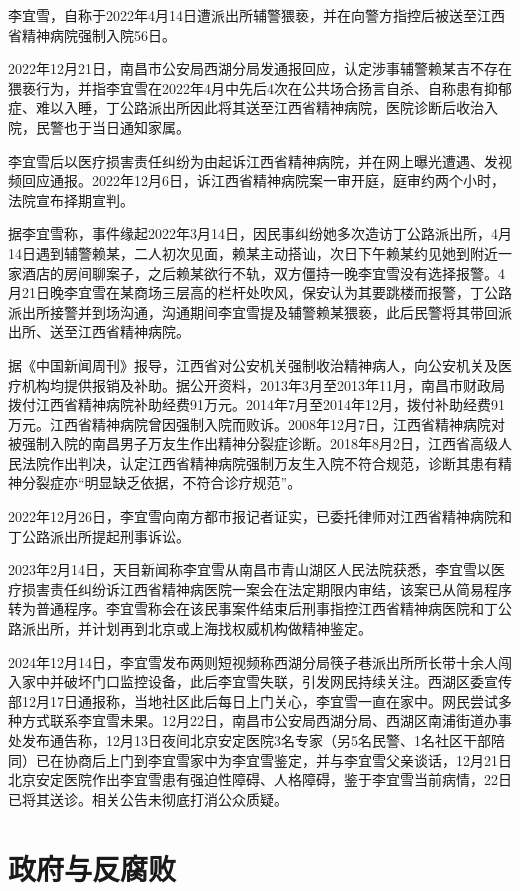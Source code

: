 李宜雪，自称于2022年4月14日遭派出所辅警猥亵，并在向警方指控后被送至江西省精神病院强制入院56日。

2022年12月21日，南昌市公安局西湖分局发通报回应，认定涉事辅警赖某吉不存在猥亵行为，并指李宜雪在2022年4月中先后4次在公共场合扬言自杀、自称患有抑郁症、难以入睡，丁公路派出所因此将其送至江西省精神病院，医院诊断后收治入院，民警也于当日通知家属。

李宜雪后以医疗损害责任纠纷为由起诉江西省精神病院，并在网上曝光遭遇、发视频回应通报。2022年12月6日，诉江西省精神病院案一审开庭，庭审约两个小时，法院宣布择期宣判。

据李宜雪称，事件缘起2022年3月14日，因民事纠纷她多次造访丁公路派出所，4月14日遇到辅警赖某，二人初次见面，赖某主动搭讪，次日下午赖某约见她到附近一家酒店的房间聊案子，之后赖某欲行不轨，双方僵持一晚李宜雪没有选择报警。4月21日晚李宜雪在某商场三层高的栏杆处吹风，保安认为其要跳楼而报警，丁公路派出所接警并到场沟通，沟通期间李宜雪提及辅警赖某猥亵，此后民警将其带回派出所、送至江西省精神病院。

据《中国新闻周刊》报导，江西省对公安机关强制收治精神病人，向公安机关及医疗机构均提供报销及补助。据公开资料，2013年3月至2013年11月，南昌市财政局拨付江西省精神病院补助经费91万元。2014年7月至2014年12月，拨付补助经费91万元。江西省精神病院曾因强制入院而败诉。2008年12月7日，江西省精神病院对被强制入院的南昌男子万友生作出精神分裂症诊断。2018年8月2日，江西省高级人民法院作出判决，认定江西省精神病院强制万友生入院不符合规范，诊断其患有精神分裂症亦“明显缺乏依据，不符合诊疗规范”。

2022年12月26日，李宜雪向南方都市报记者证实，已委托律师对江西省精神病院和丁公路派出所提起刑事诉讼。

2023年2月14日，天目新闻称李宜雪从南昌市青山湖区人民法院获悉，李宜雪以医疗损害责任纠纷诉江西省精神病医院一案会在法定期限内审结，该案已从简易程序转为普通程序。李宜雪称会在该民事案件结束后刑事指控江西省精神病医院和丁公路派出所，并计划再到北京或上海找权威机构做精神鉴定。

2024年12月14日，李宜雪发布两则短视频称西湖分局筷子巷派出所所长带十余人闯入家中并破坏门口监控设备，此后李宜雪失联，引发网民持续关注。西湖区委宣传部12月17日通报称，当地社区此后每日上门关心，李宜雪一直在家中。网民尝试多种方式联系李宜雪未果。12月22日，南昌市公安局西湖分局、西湖区南浦街道办事处发布通告称，12月13日夜间北京安定医院3名专家（另5名民警、1名社区干部陪同）已在协商后上门到李宜雪家中为李宜雪鉴定，并与李宜雪父亲谈话，12月21日北京安定医院作出李宜雪患有强迫性障碍、人格障碍，鉴于李宜雪当前病情，22日已将其送诊。相关公告未彻底打消公众质疑。


\section{政府与反腐败}

